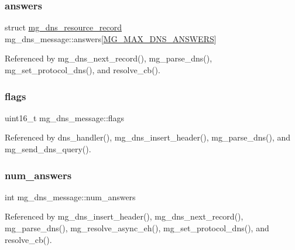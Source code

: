 \subsubsection{\texorpdfstring{answers}{answers}}
{\footnotesize\ttfamily struct \hyperlink{structmg__dns__resource__record}{mg\+\_\+dns\+\_\+resource\+\_\+record} mg\+\_\+dns\+\_\+message\+::answers\mbox{[}\hyperlink{mongoose_8h_a1832d47a93efb88b807286ed1ae80646_a1832d47a93efb88b807286ed1ae80646}{M\+G\+\_\+\+M\+A\+X\+\_\+\+D\+N\+S\+\_\+\+A\+N\+S\+W\+E\+RS}\mbox{]}}



Referenced by mg\+\_\+dns\+\_\+next\+\_\+record(), mg\+\_\+parse\+\_\+dns(), mg\+\_\+set\+\_\+protocol\+\_\+dns(), and resolve\+\_\+cb().

\mbox{\label{structmg__dns__message_a87f916bb55651d46ce74f930a5e08327_a87f916bb55651d46ce74f930a5e08327}} 
\subsubsection{\texorpdfstring{flags}{flags}}
{\footnotesize\ttfamily uint16\+\_\+t mg\+\_\+dns\+\_\+message\+::flags}



Referenced by dns\+\_\+handler(), mg\+\_\+dns\+\_\+insert\+\_\+header(), mg\+\_\+parse\+\_\+dns(), and mg\+\_\+send\+\_\+dns\+\_\+query().

\mbox{\label{structmg__dns__message_a6ebecefbdcb5c292f439123b7c780517_a6ebecefbdcb5c292f439123b7c780517}} 
\subsubsection{\texorpdfstring{num\+\_\+answers}{num\_answers}}
{\footnotesize\ttfamily int mg\+\_\+dns\+\_\+message\+::num\+\_\+answers}



Referenced by mg\+\_\+dns\+\_\+insert\+\_\+header(), mg\+\_\+dns\+\_\+next\+\_\+record(), mg\+\_\+parse\+\_\+dns(), mg\+\_\+resolve\+\_\+async\+\_\+eh(), mg\+\_\+set\+\_\+protocol\+\_\+dns(), and resolve\+\_\+cb().

